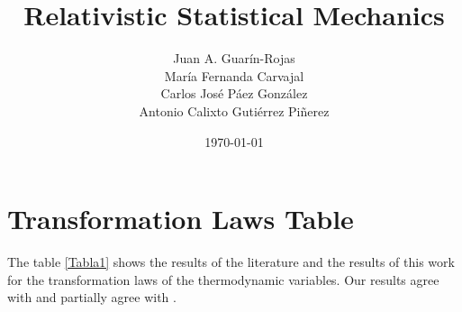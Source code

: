 \documentclass[11pt]{article}
\theoremstyle{definition}     %
\theoremstyle{definition}     %
\begin{document}
\title{Relativistic Statistical Mechanics}
\author{Juan A. Guarín-Rojas \\
María Fernanda Carvajal \\
Carlos José Páez González \\
Antonio Calixto Gutiérrez Piñerez }
\date{\today}
\maketitle


\section{Transformation Laws Table}
The table \ref{Tabla1} shows the results of the literature \cite{einstein, planck, Ott, arzelies1965transformation, Sutcliffe} and the results of this work for the transformation laws of the thermodynamic variables. Our results agree with \cite{Sutcliffe} and partially agree with \cite{Ott, arzelies1965transformation}. 
\end{document}
